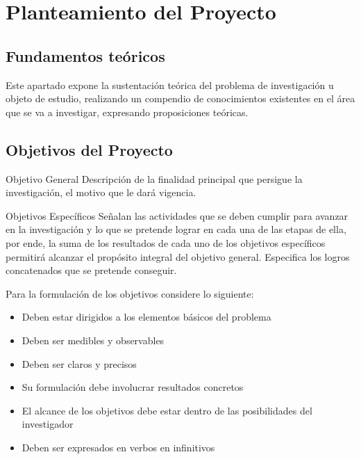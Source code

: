 \chapter{Planteamiento del Proyecto}

\section{Fundamentos teóricos}
Este apartado expone la sustentación teórica del problema de investigación u objeto de estudio, realizando un compendio de conocimientos existentes en el área que se va a investigar, expresando proposiciones teóricas.

\section{Objetivos del Proyecto}
\begin{subseccion}{Objetivo General}
Descripción de la finalidad principal que persigue la investigación, el motivo que le dará vigencia. 
\end{subseccion}

\begin{subseccion}{Objetivos Específicos}
Señalan las actividades que se deben cumplir para avanzar en la investigación y lo que se pretende lograr en cada una de las etapas de ella, por ende, la suma de los resultados de cada uno de los objetivos específicos permitirá alcanzar el propósito integral del objetivo general. Especifica los logros concatenados que se pretende conseguir.\newline

Para la formulación de los objetivos considere lo siguiente:

\begin{itemize}
    \item Deben estar dirigidos a los elementos básicos del problema
    \item Deben ser medibles y observables
    \item Deben ser claros y precisos
    \item Su formulación debe involucrar resultados concretos
    \item El alcance de los objetivos debe estar dentro de las posibilidades del investigador
    \item Deben ser expresados en verbos en infinitivos
\end{itemize}

\end{subseccion}

